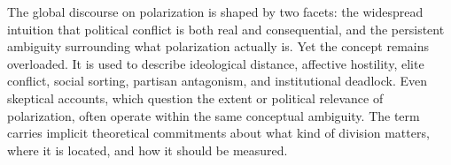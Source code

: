\documentclass[12pt]{article}
\begin{document}







The global discourse on polarization is shaped by two  facets: the widespread intuition that political conflict is both real and consequential, and the persistent ambiguity surrounding what polarization actually is. Yet the concept remains overloaded. It is used to describe ideological distance, affective hostility, elite conflict, social sorting, partisan antagonism, and institutional deadlock. Even skeptical accounts, which question the extent or political relevance of polarization, often operate within the same conceptual ambiguity. The term carries implicit theoretical commitments about what kind of division matters, where it is located, and how it should be measured.
\end{document}
